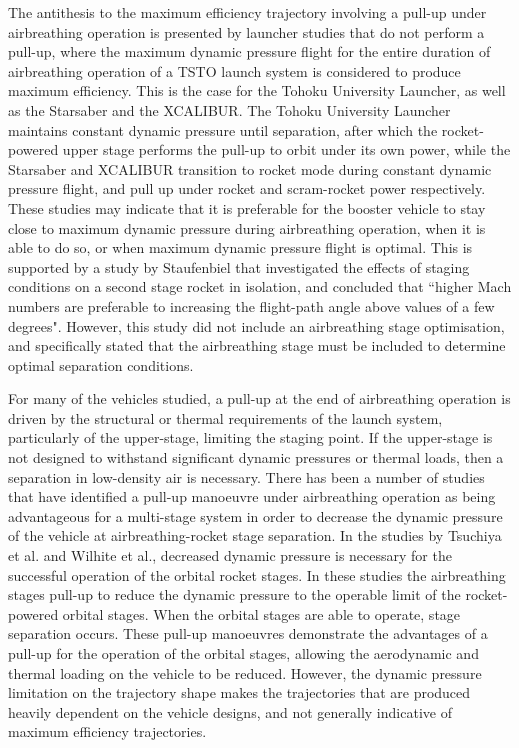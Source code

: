 The antithesis to the maximum efficiency trajectory involving a pull-up under airbreathing operation is presented by launcher studies that do not perform a pull-up, where the maximum dynamic pressure flight for the entire duration of airbreathing operation of a TSTO launch system is considered to produce maximum efficiency. 
 This is the case for the Tohoku University Launcher\cite{Takahashi1997}, as well as the Starsaber\cite{Germain2001} and the XCALIBUR\cite{Bradford2002}. The Tohoku University Launcher maintains constant dynamic pressure until separation, after which the rocket-powered upper stage performs the pull-up to orbit under its own power, while the Starsaber and XCALIBUR transition to rocket mode during constant dynamic pressure flight, and pull up under rocket and scram-rocket power respectively. These studies may indicate that it is preferable for the booster vehicle to stay close to maximum dynamic pressure during airbreathing operation, when it is able to do so, or when maximum dynamic pressure flight is optimal. This is supported by a study by Staufenbiel\cite{Staufenbiel2000} that investigated the effects of staging conditions on a second stage rocket in isolation, and concluded that ``higher Mach numbers are preferable to increasing the flight-path angle above values of a few degrees". However, this study did not include an airbreathing stage optimisation, and specifically stated that the airbreathing stage must be included to determine optimal separation conditions\cite{Staufenbiel2000}. 


For many of the vehicles studied, a pull-up at the end of airbreathing operation is driven by the structural or thermal requirements of the launch system, particularly of the upper-stage, limiting the staging point. If the upper-stage is not designed to withstand significant dynamic pressures or thermal loads, then a separation in low-density air is necessary. 
There has been a number of studies that have identified a pull-up manoeuvre under airbreathing operation as being advantageous for a multi-stage system in order to decrease the dynamic pressure of the vehicle at airbreathing-rocket stage separation\cite{Tsuchiya2005,Wilhite1991,Mehta2001}. 
In the studies by Tsuchiya et al.\cite{Tsuchiya2005} and Wilhite et al.\cite{Wilhite1991}, decreased dynamic pressure is necessary for the successful operation of the orbital rocket stages. In these studies the airbreathing stages pull-up to reduce the dynamic pressure to the operable limit of the rocket-powered orbital stages. When the orbital stages are able to operate, stage separation occurs. These pull-up manoeuvres demonstrate the advantages of a pull-up for the operation of the orbital stages, allowing the aerodynamic and thermal loading on the vehicle to be reduced. However, the dynamic pressure limitation on the trajectory shape makes the trajectories that are produced heavily dependent on the vehicle designs, and not generally indicative of maximum efficiency trajectories. 



